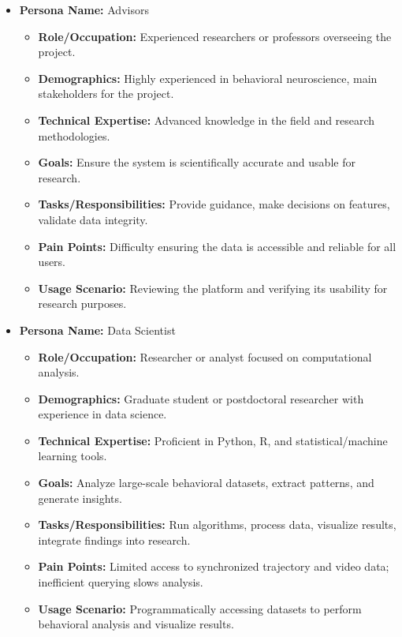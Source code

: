 \documentclass[12pt]{article}
\begin{document}
\begin{itemize}
    \item \textbf{Persona Name:} Advisors
    \begin{itemize}
        \item \textbf{Role/Occupation:} Experienced researchers or professors overseeing the project.
        \item \textbf{Demographics:} Highly experienced in behavioral neuroscience, main stakeholders for the project.
        \item \textbf{Technical Expertise:} Advanced knowledge in the field and research methodologies.
        \item \textbf{Goals:} Ensure the system is scientifically accurate and usable for research.
        \item \textbf{Tasks/Responsibilities:} Provide guidance, make decisions on features, validate data integrity.
        \item \textbf{Pain Points:} Difficulty ensuring the data is accessible and reliable for all users.
        \item \textbf{Usage Scenario:} Reviewing the platform and verifying its usability for research purposes.
    \end{itemize}

    \item \textbf{Persona Name:} Data Scientist
    \begin{itemize}
        \item \textbf{Role/Occupation:} Researcher or analyst focused on computational analysis.
        \item \textbf{Demographics:} Graduate student or postdoctoral researcher with experience in data science.
        \item \textbf{Technical Expertise:} Proficient in Python, R, and statistical/machine learning tools.
        \item \textbf{Goals:} Analyze large-scale behavioral datasets, extract patterns, and generate insights.
        \item \textbf{Tasks/Responsibilities:} Run algorithms, process data, visualize results, integrate findings into research.
        \item \textbf{Pain Points:} Limited access to synchronized trajectory and video data; inefficient querying slows analysis.
        \item \textbf{Usage Scenario:} Programmatically accessing datasets to perform behavioral analysis and visualize results.
    \end{itemize}
\end{itemize}
\end{document}
